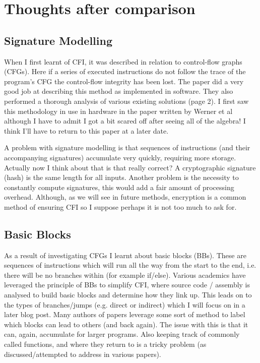 \section{Thoughts after comparison}

\subsection{Signature Modelling}

When I first learnt of CFI, it was described in relation to control-flow graphs (CFGs). Here if a series of executed instructions do not follow the trace of the program’s CFG the control-flow integrity has been lost. The paper \cite{Yang2013} did a very good job at describing this method as implemented in software. They also performed a thorough analysis of various existing solutions (page 2). I first saw this methodology in use in hardware in the paper written by Werner et al \cite{Werner2016} although I have to admit I got a bit scared off after seeing all of the algebra! I think I'll have to return to this paper at a later date.

A problem with signature modelling is that sequences of instructions (and their accompanying signatures) accumulate very quickly, requiring more storage. Actually now I think about that is that really correct? A cryptographic signature (hash) is the same length for all inputs. Another problem is the necessity to constantly compute signatures, this would add a fair amount of processing overhead. Although, as we will see in future methods, encryption is a common method of ensuring CFI so I suppose perhaps it is not too much to ask for.

\subsection{Basic Blocks}
As a result of investigating CFGs I learnt about basic blocks (BBs). These are sequences of instructions which will run all the way from the start to the end, i.e. there will be no branches within (for example if/else). Various academics have leveraged the principle of BBs to simplify CFI, where source code / assembly is analysed to build basic blocks and determine how they link up. This leads on to the types of branches/jumps (e.g. direct or indirect) which I will focus on in a later blog post. Many authors of papers leverage some sort of method to label which blocks can lead to others (and back again). The issue with this is that it can, again, accumulate for larger programs. Also keeping track of commonly called functions, and where they return to is a tricky problem (as discussed/attempted to address in various papers).

